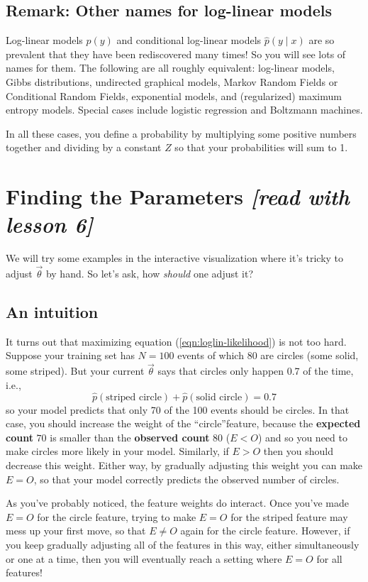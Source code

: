 \documentclass[11pt]{article}
\newcommand{\vtheta}{\vec{\theta}}
\newcommand{\ph}{\hat{p}}
\begin{document}
\subsection{Remark: Other names for log-linear models}

Log-linear models $\ph(y)$ and conditional log-linear models
$\ph(y\mid x)$ are so prevalent that they have been rediscovered many
times!  So you will see lots of names for them.  The following are all
roughly equivalent: log-linear models, Gibbs distributions, undirected
graphical models, Markov Random Fields or Conditional Random Fields,
exponential models, and (regularized) maximum entropy models.
Special cases include logistic regression and Boltzmann machines.

\medskip
In all these cases, you define a probability by multiplying some
positive numbers together and dividing by a constant $Z$ so that your
probabilities will sum to 1.

\section{Finding the Parameters {\em [read with lesson 6]}}

We will try some examples in the interactive visualization where it's
tricky to adjust $\vtheta$ by hand.  So let's ask, how {\em should}
one adjust it?

\subsection{An intuition}

It turns out that maximizing equation (\ref{eqn:loglin-likelihood}) is
not too hard.  Suppose your training set has $N=100$ events of which
80 are circles (some solid, some striped).  But your current $\vtheta$
says that circles only happen 0.7 of the time, i.e.,
$$\ph(\textrm{striped circle}) + \ph(\textrm{solid circle}) = 0.7$$
so your model predicts that only 70 of the 100 events should be circles.
%
In that case, you should increase the weight of the ``circle''feature,
because the {\bf expected count} $70$ is smaller than the {\bf
  observed count} $80$ ($E < O$) and so you need to make circles more
likely in your model.  Similarly, if $E > O$ then you should decrease this weight.
Either way, by gradually adjusting this weight you can make $E=O$, so
that your model correctly predicts the observed number of circles.

\medskip
As you've probably noticed, the feature weights do interact.  Once
you've made $E=O$ for the circle feature, trying to make $E=O$ for the
striped feature may mess up your first move, so that $E \neq O$ again
for the circle feature.  However, if you keep gradually adjusting all
of the features in this way, either simultaneously or one at a time,
then you will eventually reach a setting where $E=O$ for all features!
\end{document}
